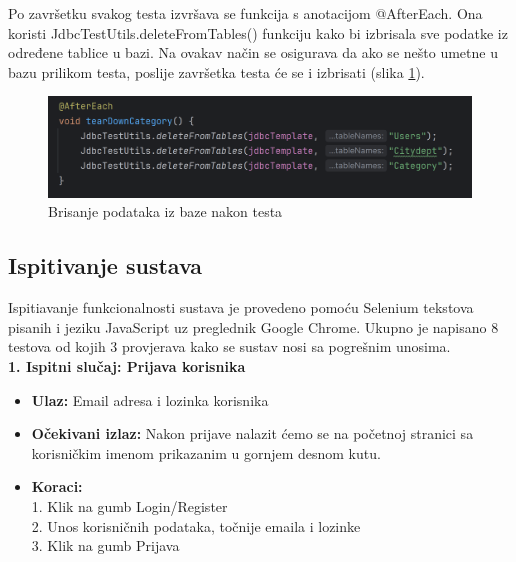             Po završetku svakog testa izvršava se funkcija s anotacijom @AfterEach.
			Ona koristi JdbcTestUtils.deleteFromTables() funkciju kako bi izbrisala sve podatke iz određene tablice u bazi.
			Na ovakav način se osigurava da ako se nešto umetne u bazu prilikom testa,
			poslije završetka testa će se i izbrisati (slika \ref{fig:afterEach}).
            \begin{figure}[H]
                \includegraphics[scale=0.60]{slike/IT_afterEach.png}
                \centering
                \caption{Brisanje podataka iz baze nakon testa}
                \label{fig:afterEach}
            \end{figure}

            \eject
			
			\subsection{Ispitivanje sustava}

			Ispitiavanje funkcionalnosti sustava je provedeno pomoću Selenium tekstova
			pisanih i jeziku JavaScript uz preglednik Google Chrome. Ukupno je napisano
			8 testova od kojih 3 provjerava kako se sustav nosi sa pogrešnim unosima.
			 \\
			\textbf{1. Ispitni slučaj: Prijava korisnika}
			 \begin{itemize}
				\item \textbf{Ulaz:} Email adresa i lozinka korisnika 
				\item \textbf{Očekivani izlaz:} Nakon prijave nalazit ćemo se na početnoj stranici sa korisničkim imenom prikazanim u gornjem desnom kutu.
				\item \textbf{Koraci:} 
				\\ 1. Klik na gumb Login/Register
				\\ 2. Unos korisničnih podataka, točnije emaila i lozinke
				\\ 3. Klik na gumb Prijava
			\end{itemize}

